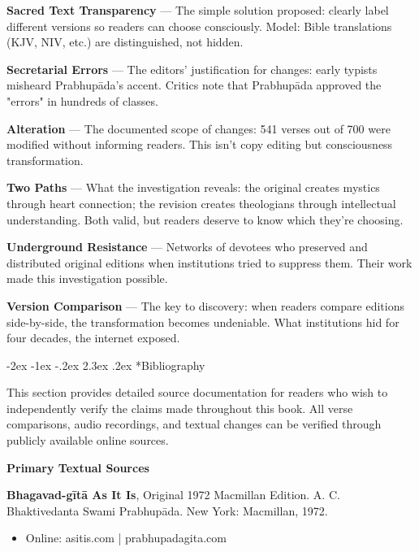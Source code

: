 \documentclass[12pt,twoside]{book}
\makeatletter
\def\cleardoublepage{\clearpage\if@twoside \ifodd\c@page\else\hbox{}\thispagestyle{empty}\newpage\if@twocolumn\hbox{}\newpage\fi\fi\fi}
\renewcommand\section{\@startsection{section}{1}{\z@}%
{-2ex \@plus -1ex \@minus -.2ex}%
{2.3ex \@plus.2ex}%
{\normalfont\Large\bfseries}}
\makeatother
\begin{document}
\textbf{Sacred Text Transparency} — The simple solution proposed: clearly label different versions so readers can choose consciously. Model: Bible translations (KJV, NIV, etc.) are distinguished, not hidden.

\textbf{Secretarial Errors} — The editors' justification for changes: early typists misheard Prabhupāda's accent. Critics note that Prabhupāda approved the "errors" in hundreds of classes.

\textbf{Alteration} — The documented scope of changes: 541 verses out of 700 were modified without informing readers. This isn't copy editing but consciousness transformation.

\textbf{Two Paths} — What the investigation reveals: the original creates mystics through heart connection; the revision creates theologians through intellectual understanding. Both valid, but readers deserve to know which they're choosing.

\textbf{Underground Resistance} — Networks of devotees who preserved and distributed original editions when institutions tried to suppress them. Their work made this investigation possible.

\textbf{Version Comparison} — The key to discovery: when readers compare editions side-by-side, the transformation becomes undeniable. What institutions hid for four decades, the internet exposed.

\cleardoublepage
\section*{Bibliography}
\thispagestyle{sectionopening}

This section provides detailed source documentation for readers who wish to independently verify the claims made throughout this book. All verse comparisons, audio recordings, and textual changes can be verified through publicly available online sources.

\vspace{0.5cm}

\textbf{\textbf{Primary Textual Sources}}

\textbf{Bhagavad-gītā As It Is}, Original 1972 Macmillan Edition. A. C. Bhaktivedanta Swami Prabhupāda. New York: Macmillan, 1972.
\begin{itemize}
\item Online: asitis.com | prabhupadagita.com
\end{itemize}
\end{document}
